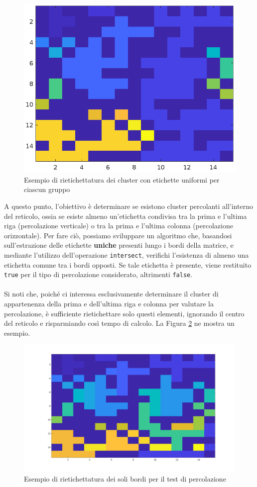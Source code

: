 \begin{figure}[H]
\begin{minipage}{0.45\textwidth}
		\includegraphics[width=\linewidth]{images/re-labelled}
	\end{minipage}
	\label{fig:relabelled}
	\caption{Esempio di rietichettatura dei cluster con etichette uniformi per ciascun gruppo}
\end{figure}
\noindent
A questo punto, l'obiettivo è determinare se esistono cluster percolanti all'interno del reticolo, ossia se esiste almeno un'etichetta condivisa tra la prima e l'ultima riga (percolazione verticale) o tra la prima e l'ultima colonna (percolazione orizzontale). Per fare ciò, possiamo sviluppare un algoritmo che, basandosi sull'estrazione delle etichette \textbf{uniche} presenti lungo i bordi della matrice, e mediante l'utilizzo dell'operazione \texttt{intersect},  verifichi l'esistenza di almeno una etichetta comune tra i bordi opposti. Se tale etichetta è presente, viene restituito \texttt{true} per il tipo di percolazione considerato, altrimenti \texttt{false}.
\\\\
\noindent
Si noti che, poiché ci interessa esclusivamente determinare il cluster di appartenenza della prima e dell’ultima riga e colonna per valutare la percolazione, è sufficiente rietichettare solo questi elementi, ignorando il centro del reticolo e risparmiando così tempo di calcolo. La Figura \ref{fig:relabelled-edge} ne mostra un esempio.
\begin{figure}
	\centering
	\includegraphics[width=0.7\linewidth]{images/re-labelled-edge}
	\caption{Esempio di rietichettatura dei soli bordi per il test di percolazione}
	\label{fig:relabelled-edge}
\end{figure}
